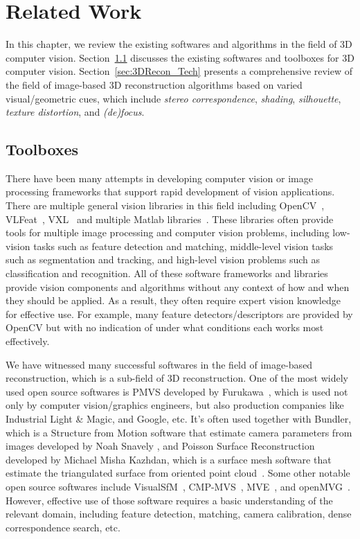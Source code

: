 
\chapter{Related Work}
\label{ch:RelatedWork}
In this chapter, we review the existing softwares and algorithms in the field of 3D computer vision. Section~\ref{sec:Toolbox} discusses the existing softwares and toolboxes for 3D computer vision. Section~\ref{sec:3DRecon_Tech} presents a comprehensive review of the field of image-based 3D reconstruction algorithms based on varied visual/geometric cues, which include \textit{stereo correspondence}, \textit{shading}, \textit{silhouette}, \textit{texture distortion}, and \textit{(de)focus}.

\section{Toolboxes}
\label{sec:Toolbox}
There have been many attempts in developing computer vision or image processing frameworks that support rapid development of vision applications. There are multiple general vision libraries in this field including OpenCV~\cite{bradski2008learning}, VLFeat~\cite{vedaldi08vlfeat}, VXL~\cite{vxl17} and multiple Matlab libraries~\cite{KovesiMATLABCode, MariottiniPr_RAM05}. These libraries often provide tools for multiple image processing and computer vision problems, including low-vision tasks such as feature detection and matching, middle-level vision tasks such as segmentation and tracking, and high-level vision problems such as classification and recognition. All of these software frameworks and libraries provide vision components and algorithms without any context of how and when they should be applied. As a result, they often require expert vision knowledge for effective use. For example, many feature detectors/descriptors are provided by OpenCV but with no indication of under what conditions each works most effectively.

We have witnessed many successful softwares in the field of image-based reconstruction, which is a sub-field of 3D reconstruction. One of the most widely used open source softwares is PMVS developed by Furukawa~\cite{furukawa2010accurate}, which is used not only by computer vision/graphics engineers, but also production companies like Industrial Light \& Magic, and Google, etc. It's often used together with Bundler, which is a Structure from Motion software that estimate camera parameters from images developed by Noah Snavely \cite{snavely2006photo}, and Poisson Surface Reconstruction developed by Michael Misha Kazhdan, which is a surface mesh software that estimate the triangulated surface from oriented point cloud~\cite{kazhdan2006poisson}. Some other notable open source softwares include VisualSfM~\cite{wu2011visualsfm}, CMP-MVS~\cite{Heller-etal-MVA-2015}, MVE~\cite{fuhrmann2014mve}, and openMVG~\cite{openMVG}. However, effective use of those software requires a basic understanding of the relevant domain, including feature detection, matching, camera calibration, dense correspondence search, etc.

